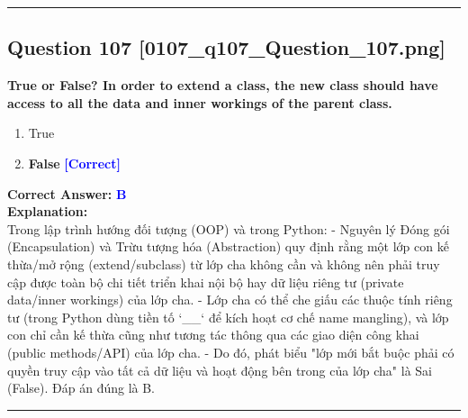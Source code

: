 \documentclass[11pt,a4paper]{article}
\begin{document}
\vspace{0.8cm}
\hrule
\vspace{0.5cm}

\begin{minipage}{\textwidth}
\subsection*{Question 107 \quad \footnotesize{[0107_q107_Question_107.png]}}
\noindent \textbf{True or False? In order to extend a class, the new class should have access to all the data and inner workings of the parent class.}

\begin{enumerate}[label=\Alph*.]
    \item True
    \item \textbf{False} \hfill \textcolor{blue}{\textbf{[Correct]}}
\end{enumerate}

\noindent \textbf{Correct Answer:} \textcolor{blue}{\textbf{B}} \\[4pt]
\noindent \textbf{Explanation:}\\
Trong lập trình hướng đối tượng (OOP) và trong Python:\newline
- Nguyên lý Đóng gói (Encapsulation) và Trừu tượng hóa (Abstraction) quy định rằng một lớp con kế thừa/mở rộng (extend/subclass) từ lớp cha không cần và không nên phải truy cập được toàn bộ chi tiết triển khai nội bộ hay dữ liệu riêng tư (private data/inner workings) của lớp cha.\newline
- Lớp cha có thể che giấu các thuộc tính riêng tư (trong Python dùng tiền tố `__` để kích hoạt cơ chế name mangling), và lớp con chỉ cần kế thừa cũng như tương tác thông qua các giao diện công khai (public methods/API) của lớp cha.\newline
- Do đó, phát biểu "lớp mới bắt buộc phải có quyền truy cập vào tất cả dữ liệu và hoạt động bên trong của lớp cha" là Sai (False). Đáp án đúng là B.
\end{minipage}
\vspace{0.8cm}
\hrule
\vspace{0.5cm}
\end{document}
